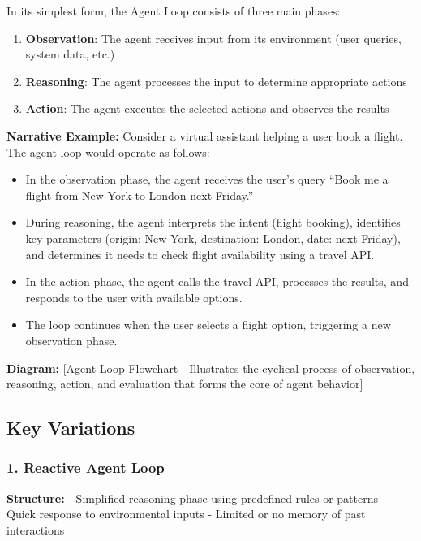 \documentclass[11pt,oneside]{book}
\providecommand{\tightlist}{%
  \setlength{\itemsep}{0pt}\setlength{\parskip}{0pt}}
\begin{document}
In its simplest form, the Agent Loop consists of three main phases:

\begin{enumerate}
\def\labelenumi{\arabic{enumi}.}
\tightlist
\item
  \textbf{Observation}: The agent receives input from its environment
  (user queries, system data, etc.)
\item
  \textbf{Reasoning}: The agent processes the input to determine
  appropriate actions
\item
  \textbf{Action}: The agent executes the selected actions and observes
  the results
\end{enumerate}

\textbf{Narrative Example:} Consider a virtual assistant helping a user
book a flight. The agent loop would operate as follows:

\begin{itemize}
\tightlist
\item
  In the observation phase, the agent receives the user's query ``Book
  me a flight from New York to London next Friday.''
\item
  During reasoning, the agent interprets the intent (flight booking),
  identifies key parameters (origin: New York, destination: London,
  date: next Friday), and determines it needs to check flight
  availability using a travel API.
\item
  In the action phase, the agent calls the travel API, processes the
  results, and responds to the user with available options.
\item
  The loop continues when the user selects a flight option, triggering a
  new observation phase.
\end{itemize}

\textbf{Diagram:} {[}Agent Loop Flowchart - Illustrates the cyclical
process of observation, reasoning, action, and evaluation that forms the
core of agent behavior{]}

\subsection{Key Variations}\label{key-variations}

\subsubsection{1. Reactive Agent Loop}\label{reactive-agent-loop}

\textbf{Structure:} - Simplified reasoning phase using predefined rules
or patterns - Quick response to environmental inputs - Limited or no
memory of past interactions
\end{document}
